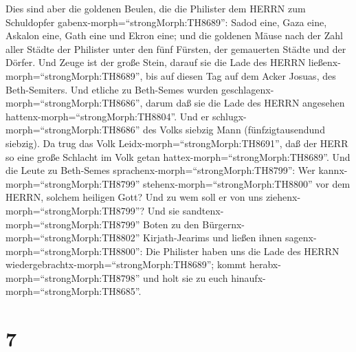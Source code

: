  Dies sind aber die goldenen Beulen, die die Philister dem
HERRN zum Schuldopfer gabenx-morph=``strongMorph:TH8689'': Sadod eine,
Gaza eine, Askalon eine, Gath eine und Ekron eine;  und die
goldenen Mäuse nach der Zahl aller Städte der Philister unter den fünf
Fürsten, der gemauerten Städte und der Dörfer. Und Zeuge ist der große
Stein, darauf sie die Lade des HERRN
ließenx-morph=``strongMorph:TH8689'', bis auf diesen Tag auf dem Acker
Josuas, des Beth-Semiters.  Und etliche zu Beth-Semes
wurden geschlagenx-morph=``strongMorph:TH8686'', darum daß sie die Lade
des HERRN angesehen hattenx-morph=``strongMorph:TH8804''. Und er
schlugx-morph=``strongMorph:TH8686'' des Volks siebzig Mann
(fünfzigtausendund siebzig). Da trug das Volk
Leidx-morph=``strongMorph:TH8691'', daß der HERR so eine große Schlacht
im Volk getan hattex-morph=``strongMorph:TH8689''.  Und die
Leute zu Beth-Semes sprachenx-morph=``strongMorph:TH8799'': Wer
kannx-morph=``strongMorph:TH8799'' stehenx-morph=``strongMorph:TH8800''
vor dem HERRN, solchem heiligen Gott? Und zu wem soll er von uns
ziehenx-morph=``strongMorph:TH8799''?  Und sie
sandtenx-morph=``strongMorph:TH8799'' Boten zu den
Bürgernx-morph=``strongMorph:TH8802'' Kirjath-Jearims und ließen ihnen
sagenx-morph=``strongMorph:TH8800'': Die Philister haben uns die Lade
des HERRN wiedergebrachtx-morph=``strongMorph:TH8689''; kommt
herabx-morph=``strongMorph:TH8798'' und holt sie zu euch
hinaufx-morph=``strongMorph:TH8685''.

\hypertarget{section-6}{%
\section{7}\label{section-6}}

